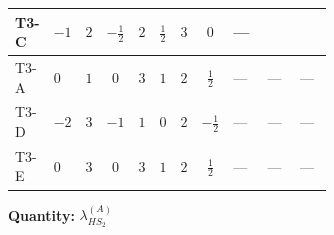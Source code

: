 \documentclass[8pt]{article}
\begin{document}
\begin{landscape}
\begin{longtable}{@{}llcccccc >{\raggedright\arraybackslash}p{0.21\linewidth} >{\raggedright\arraybackslash}p{0.21\linewidth} >{\raggedright\arraybackslash}p{0.21\linewidth}@{}}
\midrule
T3-C & $-1$ & $2$ & $-\frac{1}{2}$ & $2$ & $\frac{1}{2}$ & $3$ & $0$ & --- & \scriptsize\adjustbox{max width=\linewidth}{$\begin{gathered} +{\lambda_{H H^\dagger S_1^\dagger S_2^\dagger}^{\rm Cross}} (-3 \operatorname{Tr}\!\left({y_1}\,\left({y_2}\right)^{\dagger}\right)-4 (2 \left({\lambda_{H H^\dagger S_1^\dagger S_2^\dagger}^{\rm Cross}}\right)^{*}+\left({\lambda_{10}}\right)^{*}))\end{gathered}$} & \scriptsize\adjustbox{max width=\linewidth}{$\begin{gathered} -3 \left({\lambda_{H H^\dagger S_1^\dagger S_2^\dagger}^{\rm Cross}}\right)^{*} \operatorname{Tr}\!\left({y_2}\,\left({y_1}\right)^{\dagger}\right)\end{gathered}$} \\
\midrule
T3-A & $0$ & $1$ & $0$ & $3$ & $1$ & $2$ & $\frac{1}{2}$ & --- & --- & --- \\
\midrule
T3-D & $-2$ & $3$ & $-1$ & $1$ & $0$ & $2$ & $-\frac{1}{2}$ & --- & --- & --- \\
\midrule
T3-E & $0$ & $3$ & $0$ & $3$ & $1$ & $2$ & $\frac{1}{2}$ & --- & --- & --- \\
\midrule
\bottomrule
\end{longtable}
\clearpage
\noindent\textbf{Quantity: }$\lambda_{HS_2}^{(A)}$\par\smallskip

\end{landscape}
\end{document}
